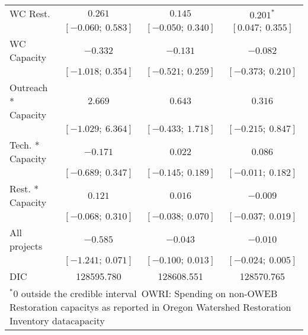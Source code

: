 \begin{table}
\begin{center}
\begin{tabular}{l c c c }
WC Rest.            & $0.261$             & $0.145$             & $0.201^{*}$         \\
                    & $[-0.060;\ 0.583]$  & $[-0.050;\ 0.340]$  & $[0.047;\ 0.355]$   \\
WC Capacity         & $-0.332$            & $-0.131$            & $-0.082$            \\
                    & $[-1.018;\ 0.354]$  & $[-0.521;\ 0.259]$  & $[-0.373;\ 0.210]$  \\
Outreach * Capacity & $2.669$             & $0.643$             & $0.316$             \\
                    & $[-1.029;\ 6.364]$  & $[-0.433;\ 1.718]$  & $[-0.215;\ 0.847]$  \\
Tech. * Capacity    & $-0.171$            & $0.022$             & $0.086$             \\
                    & $[-0.689;\ 0.347]$  & $[-0.145;\ 0.189]$  & $[-0.011;\ 0.182]$  \\
Rest. * Capacity    & $0.121$             & $0.016$             & $-0.009$            \\
                    & $[-0.068;\ 0.310]$  & $[-0.038;\ 0.070]$  & $[-0.037;\ 0.019]$  \\
All projects        & $-0.585$            & $-0.043$            & $-0.010$            \\
                    & $[-1.241;\ 0.071]$  & $[-0.100;\ 0.013]$  & $[-0.024;\ 0.005]$  \\
\hline
DIC                 & 128595.780          & 128608.551          & 128570.765          \\
\hline
\multicolumn{4}{l}{\scriptsize{$^* 0$ outside the credible interval\
       OWRI: Spending on non-OWEB Restoration capacitys as reported in Oregon Watershed Restoration Inventory datacapacity}}
\end{tabular}
\label{table:capacitymods}
\end{center}
\end{table}
